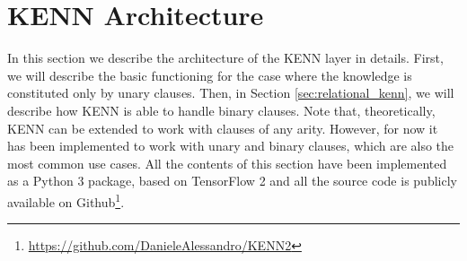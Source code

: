 \section{KENN Architecture}
\label{sec:kenn_architecture}
In this section we describe the architecture of the KENN layer in details. \textcolor{unipd}{First, we will describe the basic functioning for the case where the knowledge is constituted only by unary clauses. Then, in Section \ref{sec:relational_kenn}, we will describe how KENN is able to handle binary clauses. Note that, theoretically, KENN can be extended to work with clauses of any arity. However, for now it has been implemented to work with unary and binary clauses, which are also the most common use cases.} All the contents of this section have been implemented as a Python 3 package, based on TensorFlow 2 \cite{abadi2016tensorflow} and all the source code is publicly available on Github\footnote{\url{https://github.com/DanieleAlessandro/KENN2}}.

